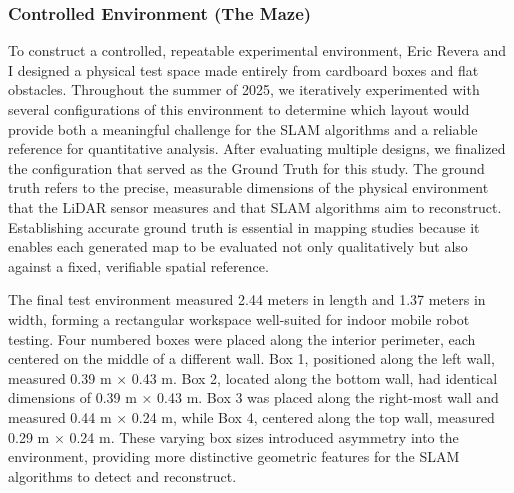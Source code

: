 \documentclass[runningheads,11pt]{llncs_bigfont_absbib}
\begin{document}
\subsubsection{Controlled Environment (The Maze)}
To construct a controlled, repeatable experimental environment, Eric Revera and I designed a physical test space made entirely from cardboard boxes and flat obstacles. Throughout the summer of 2025, we iteratively experimented with several configurations of this environment to determine which layout would provide both a meaningful challenge for the SLAM algorithms and a reliable reference for quantitative analysis. After evaluating multiple designs, we finalized the configuration that served as the Ground Truth for this study. The ground truth refers to the precise, measurable dimensions of the physical environment that the LiDAR sensor measures and that SLAM algorithms aim to reconstruct. Establishing accurate ground truth is essential in mapping studies because it enables each generated map to be evaluated not only qualitatively but also against a fixed, verifiable spatial reference.

The final test environment measured 2.44 meters in length and 1.37 meters in width, forming a rectangular workspace well-suited for indoor mobile robot testing. Four numbered boxes were placed along the interior perimeter, each centered on the middle of a different wall. Box 1, positioned along the left wall, measured 0.39 m × 0.43 m. Box 2, located along the bottom wall, had identical dimensions of 0.39 m × 0.43 m. Box 3 was placed along the right-most wall and measured 0.44 m × 0.24 m, while Box 4, centered along the top wall, measured 0.29 m × 0.24 m. These varying box sizes introduced asymmetry into the environment, providing more distinctive geometric features for the SLAM algorithms to detect and reconstruct.
\end{document}
